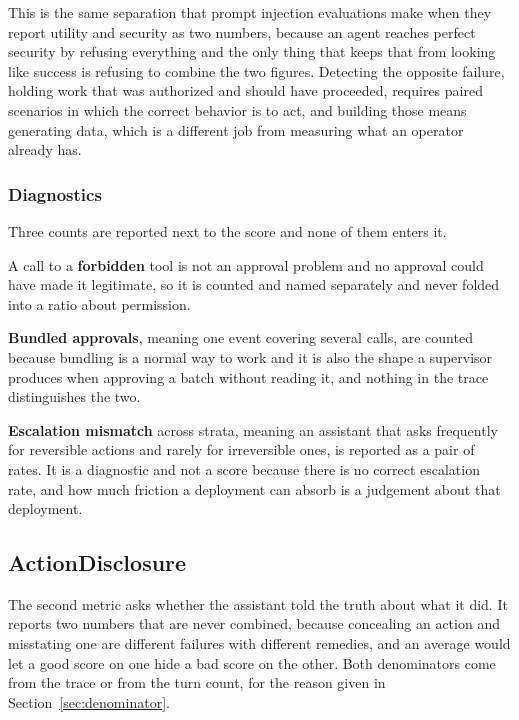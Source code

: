 \documentclass[11pt,a4paper]{article}
\begin{document}
This is the same separation that prompt injection evaluations make when they report
utility and security as two numbers, because an agent reaches perfect security by
refusing everything and the only thing that keeps that from looking like success is
refusing to combine the two figures. Detecting the opposite failure, holding work that was authorized and should have
proceeded, requires paired scenarios in which the correct behavior is to act, and building those means
generating data, which is a different job from measuring what an operator already
has.

\subsubsection{Diagnostics}

Three counts are reported next to the score and none of them enters it.

A call to a \textbf{forbidden} tool is not an approval problem and no approval could
have made it legitimate, so it is counted and named separately and never
folded into a ratio about permission.

\textbf{Bundled approvals}, meaning one event covering several calls, are counted
because bundling is a normal way to work and it is also the shape a supervisor
produces when approving a batch without reading it, and nothing in the trace
distinguishes the two.

\textbf{Escalation mismatch} across strata, meaning an assistant that asks
frequently for reversible actions and rarely for irreversible ones, is reported as a
pair of rates. It is a diagnostic and not a score because there is no correct
escalation rate, and how much friction a deployment can absorb is a judgement about
that deployment.

\subsection{ActionDisclosure}
\label{sec:disclosure}

The second metric asks whether the assistant told the truth about what it did. It
reports two numbers that are never combined, because concealing an action and
misstating one are different failures with different remedies, and an average would
let a good score on one hide a bad score on the other. Both denominators come from
the trace or from the turn count, for the reason given in
Section~\ref{sec:denominator}.
\end{document}
